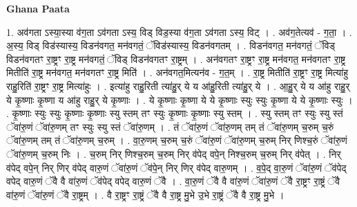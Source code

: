 \documentclass[17pt]{extarticle}
\begin{document}
\textbf{Ghana Paata } \newline

1. अव॑गता ऽस्या॒स्या व॑ग॒ता ऽव॑गता ऽस्य॒ विड् विड॒स्या व॑ग॒ता ऽव॑गता ऽस्य॒ विट् । . अव॑ग॒तेत्यव॑ - ग॒ता॒ । . अ॒स्य॒ विड् विड॑स्यास्य॒ विडन॑वगत॒ मन॑वगतं॒ ॅविड॑स्यास्य॒ विडन॑वगतम् । . विडन॑वगत॒ मन॑वगतं॒ ॅविड् विडन॑वगतꣳ रा॒ष्ट्रꣳ रा॒ष्ट्र मन॑वगतं॒ ॅविड् विडन॑वगतꣳ रा॒ष्ट्रम् । . अन॑वगतꣳ रा॒ष्ट्रꣳ रा॒ष्ट्र मन॑वगत॒ मन॑वगतꣳ रा॒ष्ट्र मितीति॑ रा॒ष्ट्र मन॑वगत॒ मन॑वगतꣳ रा॒ष्ट्र मिति॑ । . अन॑वगत॒मित्यन॑व - ग॒त॒म् । . रा॒ष्ट्र मितीति॑ रा॒ष्ट्रꣳ रा॒ष्ट्र मित्या॑हु राहु॒रिति॑ रा॒ष्ट्रꣳ रा॒ष्ट्र मित्या॑हुः । . इत्या॑हु राहु॒रिती त्या॑हु॒र् ये य आ॑हु॒रिती त्या॑हु॒र् ये । . आ॒हु॒र् ये य आ॑हु राहु॒र् ये कृ॒ष्णाः कृ॒ष्णा य आ॑हु राहु॒र् ये कृ॒ष्णाः । . ये कृ॒ष्णाः कृ॒ष्णा ये ये कृ॒ष्णाः स्युः स्युः कृ॒ष्णा ये ये कृ॒ष्णाः स्युः । . कृ॒ष्णाः स्युः स्युः कृ॒ष्णाः कृ॒ष्णाः स्यु स्तम् तꣳ स्युः कृ॒ष्णाः कृ॒ष्णाः स्यु स्तम् । . स्यु स्तम् तꣳ स्युः स्यु स्तं ॅवा॑रु॒णं ॅवा॑रु॒णम् तꣳ स्युः स्यु स्तं ॅवा॑रु॒णम् । . तं ॅवा॑रु॒णं ॅवा॑रु॒णम् तम् तं ॅवा॑रु॒णम् च॒रुम् च॒रुं ॅवा॑रु॒णम् तम् तं ॅवा॑रु॒णम् च॒रुम् । . वा॒रु॒णम् च॒रुम् च॒रुं ॅवा॑रु॒णं ॅवा॑रु॒णम् च॒रुम् निर् णिश्च॒रुं ॅवा॑रु॒णं ॅवा॑रु॒णम् च॒रुम् निः । . च॒रुम् निर् णिश्च॒रुम् च॒रुम् निर् व॑पेद् वपे॒न् निश्च॒रुम् च॒रुम् निर् व॑पेत् । . निर् व॑पेद् वपे॒न् निर् णिर् व॑पेद् वारु॒णं ॅवा॑रु॒णं ॅव॑पे॒न् निर् णिर् व॑पेद् वारु॒णम् । . व॒पे॒द् वा॒रु॒णं ॅवा॑रु॒णं ॅव॑पेद् वपेद् वारु॒णं ॅवै वै वा॑रु॒णं ॅव॑पेद् वपेद् वारु॒णं ॅवै । . वा॒रु॒णं ॅवै वै वा॑रु॒णं ॅवा॑रु॒णं ॅवै रा॒ष्ट्रꣳ रा॒ष्ट्रं ॅवै वा॑रु॒णं ॅवा॑रु॒णं ॅवै रा॒ष्ट्रम् । . वै रा॒ष्ट्रꣳ रा॒ष्ट्रं ॅवै वै रा॒ष्ट्र मु॒भे उ॒भे रा॒ष्ट्रं ॅवै वै रा॒ष्ट्र मु॒भे । \newline
\end{document}
